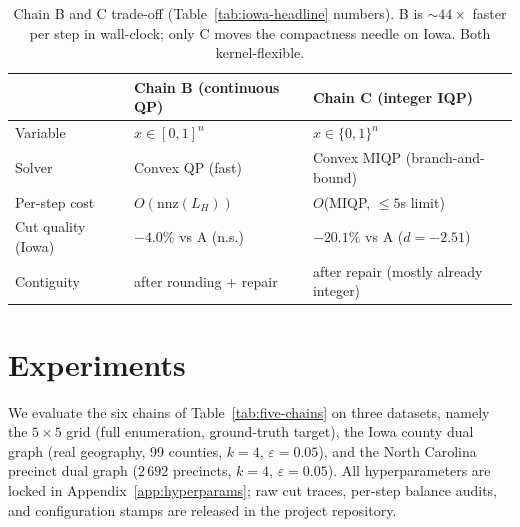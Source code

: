 \documentclass[11pt]{article}
\begin{document}
\begin{table}[H]
\centering
\small
\begin{tabular}{lll}
\toprule
 & Chain B (continuous QP) & Chain C (integer IQP) \\
\midrule
Variable & $x \in [0,1]^n$ & $x \in \{0,1\}^n$ \\
Solver & Convex QP (fast) & Convex MIQP (branch-and-bound) \\
Per-step cost & $O(\text{nnz}(L_H))$ & $O$(MIQP, $\le 5$s limit) \\
Cut quality (Iowa) & $-4.0\%$ vs A (n.s.) & $-20.1\%$ vs A ($d = -2.51$) \\
Contiguity & after rounding + repair & after repair (mostly already integer) \\
\bottomrule
\end{tabular}
\caption{Chain B and C trade-off (Table~\ref{tab:iowa-headline}
  numbers). B is $\sim 44\times$ faster per step in wall-clock; only C
  moves the compactness needle on Iowa. Both
  kernel-flexible.}\label{tab:b-vs-c}
\end{table}

\section{Experiments}\label{sec:experiments}

We evaluate the six chains of Table~\ref{tab:five-chains} on three
datasets, namely the $5 \times 5$ grid (full enumeration, ground-truth
target), the Iowa county dual graph (real geography, 99 counties,
$k = 4$, $\varepsilon = 0.05$), and the North Carolina precinct dual
graph ($2\,692$ precincts, $k = 4$, $\varepsilon = 0.05$). All hyperparameters are
locked in Appendix~\ref{app:hyperparams}; raw cut traces, per-step
balance audits, and configuration stamps are released in the project
repository.
\end{document}
